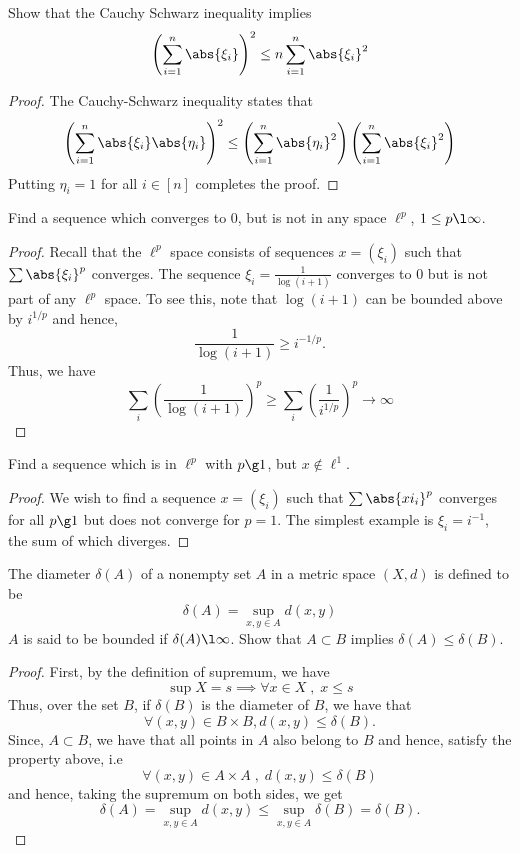 \begin{question}
    Show that the Cauchy Schwarz inequality implies
    \[\left(\sum_{i=1}^n \abs{\xi_i} \right)^2 \leq n \sum_{i=1}^n \abs{\xi_i}^2\]
    \label{section1.2-3}
\end{question}
\begin{proof}
    The Cauchy-Schwarz inequality states that
    \[\left(\sum_{i=1}^n \abs{\xi_i} \abs{\eta_i} \right)^2 \leq  \left( \sum_{i=1}^n \abs{\eta_i}^2 \right)\left( \sum_{i=1}^n \abs{\xi_i}^2 \right)\]
    Putting $\eta_i = 1$ for all $i \in [n]$ completes the proof.
\end{proof}

\begin{question}
    Find a sequence which converges to $0$, but is not in any space $\ell^p$, $1 \leq p \l \infty$. 
    \label{section1.2-4}
\end{question}
\begin{proof}
    Recall that the $\ell^p$ space consists of sequences $x = (\xi_i)$ such that $\sum \abs{\xi_i}^p$ converges. The sequence $\xi_i = \frac{1}{\log(i + 1)}$ converges to 0 but is not part of any $\ell^p$ space. To see this, note that $\log (i+1) $ can be bounded above by $i^{1/p}$ and hence, 
    \[\frac{1}{\log(i+1)} \geq i^{-1/p}.\]
    Thus, we have
    \[\sum_{i} \left(\frac{1}{\log(i+1)} \right)^p \geq \sum_i \left( \frac{1}{i^{1/p}}\right)^p \rightarrow \infty\]
\end{proof}

\begin{question}
    Find a sequence which is in $\ell^p$ with $p \g 1$, but $x \notin \ell^1$. 
    \label{section1.2-5}
\end{question}
\begin{proof}
    We wish to find a sequence $x = (\xi_i)$ such that $\sum \abs{xi_i}^p$ converges for all $p \g 1$ but does not converge for $p = 1$. The simplest example is $\xi_i = i^{-1}$, the sum of which diverges.
\end{proof}

\begin{question}
    The diameter $\delta(A)$ of a nonempty set $A$ in a metric space $(X,d)$ is defined to be 
    \[\delta(A) = \sup_{x , y \in A} d(x,y)\]
    $A$ is said to be bounded if $\delta(A) \l \infty$. Show that $A \subset B$ implies $\delta(A) \leq \delta(B)$.
    \label{section1.2-6}
\end{question}
\begin{proof}
    First, by the definition of supremum, we have
    \[\sup X = s \implies \forall x \in X \;,\; x \leq s\]
    Thus, over the set $B$, if $\delta(B)$ is the diameter of $B$, we have that
    \[\forall (x , y) \in B \times B , d(x,y) \leq \delta(B).\]
    Since, $A \subset B$, we have that
    all points in $A$ also belong to $B$ and hence, satisfy the property above, i.e
    \[\forall (x,y) \in A \times A \;,\; d(x,y) \leq \delta(B)\]
    and hence, taking the supremum on both sides, we get
    \[\delta(A) = \sup_{x,y \in A} d(x,y) \leq \sup_{x , y \in A}\delta(B) = \delta(B).\]
\end{proof}

